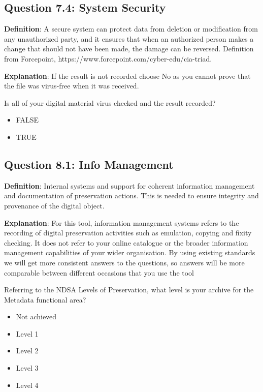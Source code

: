 \documentclass[a4paper,oneside]{article}
\providecommand{\tightlist}{%
    \setlength{\itemsep}{2pt}\setlength{\parskip}{0pt}}
\begin{document}
\begin{landscape}
\newpage

\hypertarget{question-7.4-system-security}{%
\subsection{Question 7.4: System Security}\label{question-7.4-system-security}}

\textbf{Definition}: A secure system can protect data from deletion or modification from any unauthorized party, and it ensures that when an authorized person makes a change that should not have been made, the damage can be reversed. Definition from Forcepoint, https://www.forcepoint.com/cyber-edu/cia-triad.

\textbf{Explanation}: If the result is not recorded choose No as you cannot prove that the file was virus-free when it was received.

Is all of your digital material virus checked and the result recorded?

\begin{itemize}
\tightlist
\item
  FALSE\\
\item
  TRUE
\end{itemize}

\newpage

\hypertarget{question-8.1-info-management}{%
\subsection{Question 8.1: Info Management}\label{question-8.1-info-management}}

\textbf{Definition}: Internal systems and support for coherent information management and documentation of preservation actions. This is needed to ensure integrity and provenance of the digital object.

\textbf{Explanation}: For this tool, information management systems refers to the recording of digital preservation activities such as emulation, copying and fixity checking. It does not refer to your online catalogue or the broader information management capabilities of your wider organisation.
By using existing standards we will get more consistent answers to the questions, so answers will be more comparable between different occasions that you use the tool

Referring to the NDSA Levels of Preservation, what level is your archive for the Metadata functional area?

\begin{itemize}
\tightlist
\item
  Not achieved\\
\item
  Level 1\\
\item
  Level 2\\
\item
  Level 3\\
\item
  Level 4
\end{itemize}


\end{landscape}
\end{document}
